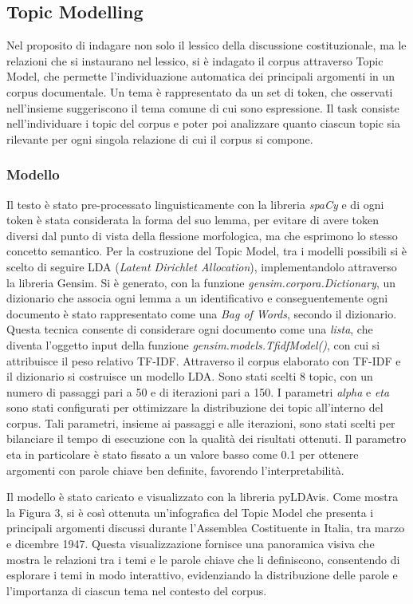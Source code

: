 \documentclass[11pt,twocolumn]{article}
\begin{document}
\subsection{Topic Modelling}

Nel proposito di indagare non solo il lessico della discussione costituzionale, ma le relazioni che si instaurano nel lessico, si è indagato il corpus attraverso Topic Model, che permette l'individuazione automatica dei principali argomenti in un corpus documentale. Un tema è rappresentato da un set di token, che osservati nell'insieme suggeriscono il tema comune di cui sono espressione. Il task consiste nell'individuare i topic del corpus e poter poi analizzare quanto ciascun topic sia rilevante per ogni singola relazione di cui il corpus si compone. 

\subsubsection{Modello}
Il testo è stato pre-processato linguisticamente con la libreria \textit{spaCy} e di ogni token è stata considerata la forma del suo lemma, per evitare di avere token diversi dal punto di vista della flessione morfologica, ma che esprimono lo stesso concetto semantico. Per la costruzione del Topic Model, tra i modelli possibili si è scelto di seguire LDA (\textit{Latent Dirichlet Allocation}), implementandolo attraverso la libreria Gensim. Si è generato, con la funzione \textit{gensim.corpora.Dictionary}, un dizionario che associa ogni lemma a un identificativo e conseguentemente ogni documento è stato rappresentato come una \textit{Bag of Words}, secondo il dizionario. Questa tecnica consente di considerare ogni documento come una \textit{lista}, che diventa l'oggetto input della funzione \textit{gensim.models.TfidfModel()}, con cui si attribuisce il peso relativo TF-IDF.
Attraverso il corpus elaborato con TF-IDF e il dizionario si costruisce un modello LDA. Sono stati scelti 8 topic, con un numero di passaggi pari a 50 e di iterazioni pari a 150. I parametri \textit{alpha} e \textit{eta} sono stati configurati per ottimizzare la distribuzione dei topic all'interno del corpus. Tali parametri, insieme ai passaggi e alle iterazioni, sono stati scelti per bilanciare il tempo di esecuzione con la qualità dei risultati ottenuti. Il parametro eta in particolare è stato fissato a un valore basso come 0.1 per ottenere argomenti con parole chiave ben definite, favorendo l'interpretabilità.

Il modello è stato caricato e  visualizzato con la libreria pyLDAvis. Come mostra la Figura 3, si è così ottenuta un'infografica del Topic Model che presenta i principali argomenti discussi durante l'Assemblea Costituente in Italia, tra marzo e dicembre 1947. Questa visualizzazione fornisce una panoramica visiva che mostra le relazioni tra i temi e le parole chiave che li definiscono, consentendo di esplorare i temi in modo interattivo, evidenziando la distribuzione delle parole e l'importanza di ciascun tema nel contesto del corpus.
\end{document}
